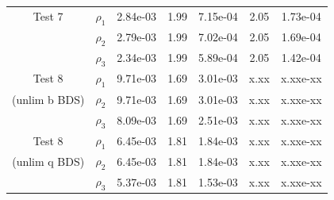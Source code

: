 \documentclass[final]{siamltex}
\begin{document}
\begin{table}[h]
\begin{center}
\begin{tabular}{ccccccc}
\hline
Test 7              & $\rho_1$ & 2.84e-03 & 1.99 & 7.15e-04 & 2.05 & 1.73e-04 \\
                    & $\rho_2$ & 2.79e-03 & 1.99 & 7.02e-04 & 2.05 & 1.69e-04 \\
                    & $\rho_3$ & 2.34e-03 & 1.99 & 5.89e-04 & 2.05 & 1.42e-04 \\
\hline
Test 8              & $\rho_1$ & 9.71e-03 & 1.69 & 3.01e-03 & x.xx & x.xxe-xx \\
(unlim b BDS)       & $\rho_2$ & 9.71e-03 & 1.69 & 3.01e-03 & x.xx & x.xxe-xx \\
                    & $\rho_3$ & 8.09e-03 & 1.69 & 2.51e-03 & x.xx & x.xxe-xx \\
\hline
Test 8              & $\rho_1$ & 6.45e-03 & 1.81 & 1.84e-03 & x.xx & x.xxe-xx \\
(unlim q BDS)       & $\rho_2$ & 6.45e-03 & 1.81 & 1.84e-03 & x.xx & x.xxe-xx \\
                    & $\rho_3$ & 5.37e-03 & 1.81 & 1.53e-03 & x.xx & x.xxe-xx
\end{tabular}
\end{center}
\end{table}
\end{document}
